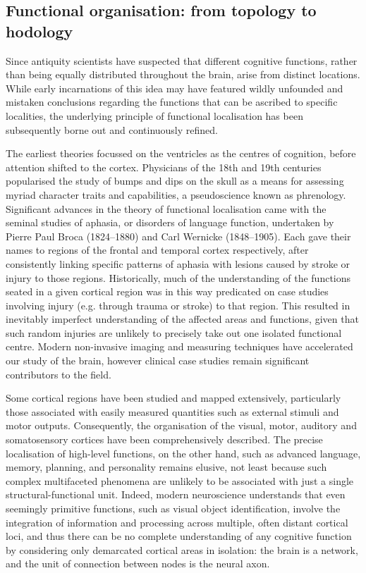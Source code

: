 \subsection{Functional organisation: from topology to hodology}\label{sec:hodology}

Since antiquity scientists have suspected that different cognitive functions, rather than being equally distributed throughout the brain, arise from distinct locations.
While early incarnations of this idea may have featured wildly unfounded and mistaken conclusions regarding the functions that can be ascribed to specific localities, the underlying principle of functional localisation has been subsequently borne out and continuously refined.

The earliest theories focussed on the ventricles as the centres of cognition, before attention shifted to the cortex.\autocite{Folzenlogen2019}
Physicians of the 18th and 19th centuries popularised the study of bumps and dips on the skull as a means for assessing myriad character traits and capabilities, a pseudoscience known as phrenology.
Significant advances in the theory of functional localisation came with the seminal studies of aphasia, or disorders of language function, undertaken by Pierre Paul Broca (1824--1880) and Carl Wernicke (1848--1905).
Each gave their names to regions of the frontal and temporal cortex respectively, after consistently linking specific patterns of aphasia with lesions caused by stroke or injury to those regions.
Historically, much of the understanding of the functions seated in a given cortical region was in this way predicated on case studies involving injury (e.g. through trauma or stroke) to that region.
This resulted in inevitably imperfect understanding of the affected areas and functions, given that such random injuries are unlikely to precisely take out one isolated functional centre.
Modern non-invasive imaging and measuring techniques have accelerated our study of the brain, however clinical case studies remain significant contributors to the field.

Some cortical regions have been studied and mapped extensively, particularly those associated with easily measured quantities such as external stimuli and motor outputs.
Consequently, the organisation of the visual, motor, auditory and somatosensory cortices have been comprehensively described.
The precise localisation of high-level functions, on the other hand, such as advanced language, memory, planning, and personality remains elusive, not least because such complex multifaceted phenomena are unlikely to be associated with just a single structural-functional unit.\autocite{Catani2007}
Indeed, modern neuroscience understands that even seemingly primitive functions, such as visual object identification, involve the integration of information and processing across multiple, often distant cortical loci,\autocite{ffytche2005} and thus there can be no complete understanding of any cognitive function by considering only demarcated cortical areas in isolation: the brain is a network, and the unit of connection between nodes is the neural axon.

